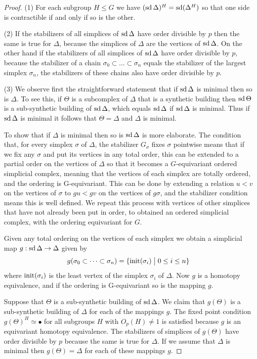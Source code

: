 \documentclass[12pt]{amsart}
\theoremstyle{plain}
\theoremstyle{definition}
\theoremstyle{remark}
\numberwithin{equation}{section}
\def \sd{\mathop{\rm sd}}
\begin{document}
\begin{proof}
    (1)  For each subgroup $H\le G$ we have $(\sd\Delta)^H=\sd(\Delta^H)$ so that one side is contractible if and only if so is the other.

(2) If the stabilizers of all simplices of $\sd\Delta$ have order divisible by $p$ then the same is true for $\Delta$, because the simplices of $\Delta$ are the vertices of $\sd\Delta$. On the other hand if the stabilizers of all simplices of $\sd\Delta$ have order divisible by $p$, because the stabilizer of a chain $\sigma_0\subset\ldots \subset\sigma_n$ equals the stabilizer of the largest simplex $\sigma_n$, the stabilizers of these chains also have order divisible by $p$.

       (3) We observe first the straightforward statement that if $\sd\Delta$ is minimal then so is $\Delta$. To see this, if $\Theta$ is a subcomplex of $\Delta$ that is a synthetic building then $\sd\Theta$ is a sub-synthetic building of $\sd\Delta$, which equals $\sd\Delta$ if $\sd\Delta$ is minimal. Thus if $\sd\Delta$ is minimal it follows that $\Theta=\Delta$ and $\Delta$ is minimal.

       To show that if $\Delta$ is minimal then so is $\sd\Delta$ is more elaborate. The condition that, for every simplex $\sigma$ of $\Delta$, the stabilizer $G_\sigma$ fixes $\sigma$ pointwise means that if we fix any $ \sigma$ and put its vertices in any total order, this can be extended to a partial order on the vertices of $\Delta$ so that it becomes a $G$-equivariant ordered simplicial complex, meaning that the vertices of each simplex are totally ordered, and the ordering is G-equivariant. This can be done by extending a relation $u<v$ on the vertices of $\sigma$ to $gu<gv$ on the vertices of $g\sigma$, and the stabilizer condition means this is well defined. We repeat this process with vertices of other simplices that have not already been put in order, to obtained an ordered simplicial complex, with the ordering equivariant for $G$.

Given any total ordering on the vertices of each simplex we obtain a simplicial map $g: \sd \Delta \to\Delta$ given by 
$$
g(\sigma_0\subset\cdots\subset\sigma_n) = \{\hbox{init}(\sigma_i)\bigm|0\le i\le n\}
$$
where $\hbox{init}(\sigma_i)$ is the least vertex of the simplex $\sigma_i$ of $\Delta$. Now $g$ is a homotopy equivalence, and if the ordering is G-equivariant so is the mapping $g$.

Suppose that $\Theta$ is a sub-synthetic building of $\sd \Delta$. We claim that $g(\Theta)$ is a sub-synthetic building of $\Delta$ for each of the mappings $g$. The fixed point condition $g(\Theta)^H\simeq \bullet$ for all subgroups $H$ with $O_p(H)\ne 1$  is satisfied because  $g$  is an equivariant homotopy equivalence. The stabilizers of simplices of $g(\Theta)$ have order divisible by $p$ because the same is true for $\Delta$. If we assume that  $\Delta$ is minimal then $g(\Theta) = \Delta$ for each of these mappings $g$. 


\end{proof}
\end{document}
